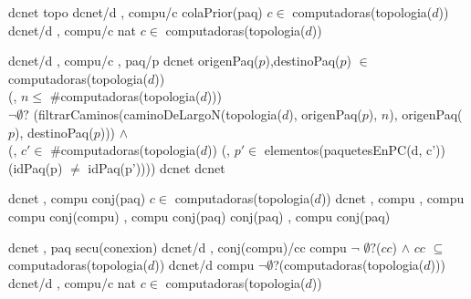 \begin{tad}{}


\tadObservadores
	 {dcnet} {topo} {}
	 {dcnet/d , compu/c} {colaPrior(paq)} {$c\in$ computadoras(topologia($d$))}
	 {dcnet/d , compu/c} {nat} {$c\in$ computadoras(topologia($d$))} 

\tadGeneradores
	 {dcnet/d , compu/c , paq/p} {dcnet} {origenPaq($p$),destinoPaq($p$)
																	  $\in$ computadoras(topologia($d$)) \yluego\\
																	 (, $n \leq$ \#computadoras(topologia($d$)))\\
																	  $\neg\emptyset?$
																(filtrarCaminos(caminoDeLargoN(topologia($d$), origenPaq($p$), $n$), origenPaq($p$), destinoPaq($p$))) $\land$ \\
                              (, $c' \in$ \#computadoras(topologia($d$)) (, $p' \in$ elementos(paquetesEnPC(d, c')) (idPaq(p) $\neq$ idPaq(p'))))}
	 {dcnet} {dcnet} {}

\tadOtrasOperaciones
	 {dcnet , compu} {conj(paq)} {$c\in$ computadoras(topologia($d$))}
	 {dcnet , compu , compu} {compu} {}
	 {conj(compu) , compu} {conj(paq)} {}
	 {conj(paq) , compu} {conj(paq)} {}
	
	 {dcnet , paq} {secu(conexion)} {}
	 {dcnet/d , conj(compu)/cc} {compu} {$\neg$ $\emptyset?$($cc$) $\wedge$ 
																	$cc$ $\subseteq$ computadoras(topologia($d$))}	
	 {dcnet/d} {compu} {$\neg\emptyset$?(computadoras(topologia($d$)))}   
	 {dcnet/d , compu/c} {nat}	{$c\in$ computadoras(topologia($d$))}							  



\end{tad}
